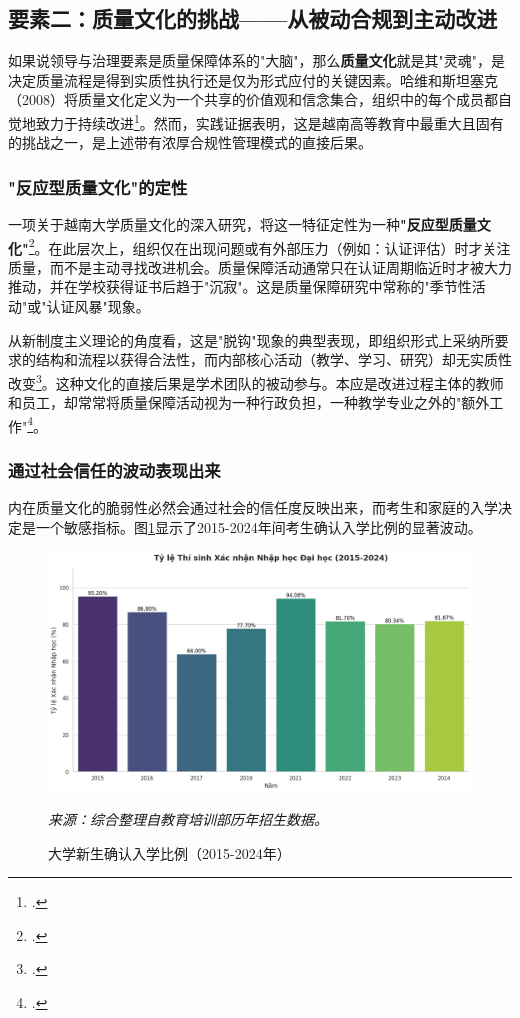 \subsection{要素二：质量文化的挑战——从被动合规到主动改进}
\label{subsec:thach_thuc_vanhoa}

如果说领导与治理要素是质量保障体系的"大脑"，那么\textbf{质量文化}就是其"灵魂"，是决定质量流程是得到实质性执行还是仅为形式应付的关键因素。哈维和斯坦塞克（2008）将质量文化定义为一个共享的价值观和信念集合，组织中的每个成员都自觉地致力于持续改进\footcite{HarveyStensaker2008}。然而，实践证据表明，这是越南高等教育中最重大且固有的挑战之一，是上述带有浓厚合规性管理模式的直接后果。

\subsubsection{"反应型质量文化"的定性}
一项关于越南大学质量文化的深入研究，将这一特征定性为一种\textbf{"反应型质量文化"}\footcite{vjol_reactiveculture_2021}。在此层次上，组织仅在出现问题或有外部压力（例如：认证评估）时才关注质量，而不是主动寻找改进机会。质量保障活动通常只在认证周期临近时才被大力推动，并在学校获得证书后趋于"沉寂"。这是质量保障研究中常称的"季节性活动"或"认证风暴"现象。

从新制度主义理论的角度看，这是"脱钩"现象的典型表现，即组织形式上采纳所要求的结构和流程以获得合法性，而内部核心活动（教学、学习、研究）却无实质性改变\footcite{MeyerRowan1977}。这种文化的直接后果是学术团队的被动参与。本应是改进过程主体的教师和员工，却常常将质量保障活动视为一种行政负担，一种教学专业之外的"额外工作"\footcite{iosr_passiveparticipation_2021}。

\subsubsection{通过社会信任的波动表现出来}
内在质量文化的脆弱性必然会通过社会的信任度反映出来，而考生和家庭的入学决定是一个敏感指标。图\ref{fig:ty_le_nhap_hoc}显示了2015-2024年间考生确认入学比例的显著波动。

\begin{figure}[h!]
    \centering
    \includegraphics[width=\textwidth]{image/ty_le_nhap_hoc_2015-2024.png}
    \caption{大学新生确认入学比例（2015-2024年）}
    \label{fig:ty_le_nhap_hoc}
    \vspace{0.2cm}
    \footnotesize{\textit{来源：综合整理自教育培训部历年招生数据。}}
\end{figure}

